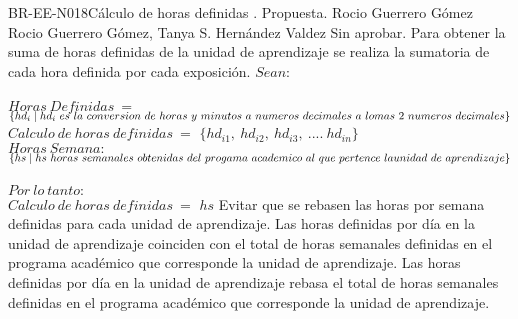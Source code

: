 \begin{BusinessRule}{BR-EE-N018}{Cálculo de horas definidas}
	{\bcCondition}    %
	{\btEnabler}     %
	{\blControlling}    %
	.
	\BRItem[Estado] Propuesta.
	 Rocio Guerrero Gómez
	 Rocio Guerrero Gómez, Tanya S. Hernández Valdez
	 Sin aprobar.
	\BRItem[Descripción] Para obtener la suma de horas definidas de la unidad de aprendizaje se realiza la sumatoria de cada hora definida por cada exposición.
	\BRItem[Sentencia]  $Sean:$ \\\\
	$Horas\ Definidas\ =$ $\{hd_i \mid hd_i\ es\ la\ conversion\ de\ horas\ y\ minutos\ a\ numeros\ decimales\ a\ lo\\ mas\ 2\ numeros\ decimales\}$\\
	$Calculo\ de\ horas\ definidas\ =$ $\{hd_{i1},\ hd_{i2},\ hd_{i3},\ ....\ hd_{in}\}$ \\
	$Horas\ Semana:$ $\{hs \mid hs\ horas\ semanales\ obtenidas\ del\ progama\ academico\ al\ que\ pertence\ la\\ unidad\ de\ aprendizaje\}$\\\\
	$Por\ lo\ tanto:$\\
	$Calculo\ de\ horas\ definidas\ =$ $hs$
	\BRItem[Motivación] Evitar que se rebasen las horas por semana definidas para cada unidad de aprendizaje.
	 \cdtEmpty
		Las horas definidas por día en la unidad de aprendizaje coinciden con el total de horas semanales definidas en el programa académico que corresponde la unidad de aprendizaje.
	 \cdtEmpty
		Las horas definidas por día en la unidad de aprendizaje rebasa el total de horas semanales definidas en el programa académico que corresponde la unidad de aprendizaje.
\end{BusinessRule}

